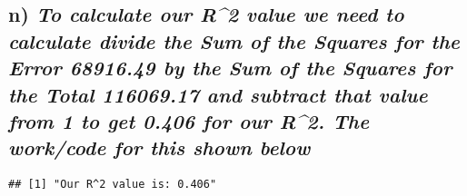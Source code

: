 \documentclass[
]{article}
\newenvironment{Shaded}{\begin{snugshade}}{\end{snugshade}}
\newcommand{\CommentTok}[1]{\textcolor[rgb]{0.56,0.35,0.01}{\textit{#1}}}
\newcommand{\DecValTok}[1]{\textcolor[rgb]{0.00,0.00,0.81}{#1}}
\newcommand{\FunctionTok}[1]{\textcolor[rgb]{0.00,0.00,0.00}{#1}}
\newcommand{\NormalTok}[1]{#1}
\newcommand{\OtherTok}[1]{\textcolor[rgb]{0.56,0.35,0.01}{#1}}
\newcommand{\SpecialCharTok}[1]{\textcolor[rgb]{0.00,0.00,0.00}{#1}}
\newcommand{\StringTok}[1]{\textcolor[rgb]{0.31,0.60,0.02}{#1}}
\begin{document}
\hypertarget{n-to-calculate-our-r2-value-we-need-to-calculate-divide-the-sum-of-the-squares-for-the-error-68916.49-by-the-sum-of-the-squares-for-the-total-116069.17-and-subtract-that-value-from-1-to-get-0.406-for-our-r2.-the-workcode-for-this-shown-below}{%
\subsection{\texorpdfstring{n) \emph{To calculate our R\^{}2 value we
need to calculate divide the Sum of the Squares for the Error 68916.49
by the Sum of the Squares for the Total 116069.17 and subtract that
value from 1 to get 0.406 for our R\^{}2. The work/code for this shown
below}}{n) To calculate our R\^{}2 value we need to calculate divide the Sum of the Squares for the Error 68916.49 by the Sum of the Squares for the Total 116069.17 and subtract that value from 1 to get 0.406 for our R\^{}2. The work/code for this shown below}}\label{n-to-calculate-our-r2-value-we-need-to-calculate-divide-the-sum-of-the-squares-for-the-error-68916.49-by-the-sum-of-the-squares-for-the-total-116069.17-and-subtract-that-value-from-1-to-get-0.406-for-our-r2.-the-workcode-for-this-shown-below}}

\begin{Shaded}
\end{Shaded}

\begin{verbatim}
## [1] "Our R^2 value is: 0.406"
\end{verbatim}
\end{document}
